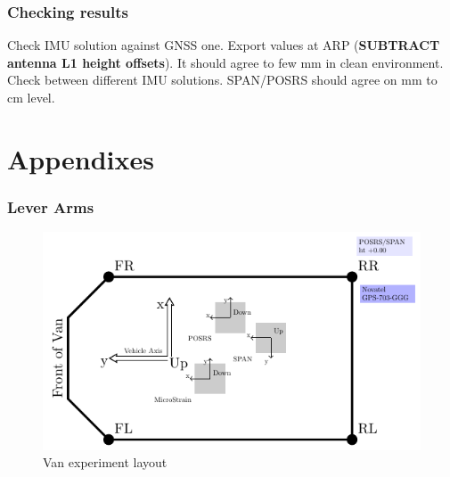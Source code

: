 \documentclass[11pt,fleqn]{book} %
\begin{document}
\section{Checking results}
Check IMU solution against GNSS one. Export values at ARP (\textbf{SUBTRACT antenna L1 height offsets}). It should agree to few mm in clean environment.  Check between different IMU solutions. SPAN/POSRS should agree on mm to cm level.


\renewcommand\thesection{\Alph{section}}
\setcounter{chapter}{1}
\setcounter{section}{0}
\part{Appendixes}



\section{Lever Arms}

\begin{figure}[tbh]
\centering\includegraphics[clip,width=12cm]{pic/VanLayout}%
\caption{Van experiment layout\label{fig:Van-experiment-layout}}
\end{figure}
\end{document}
